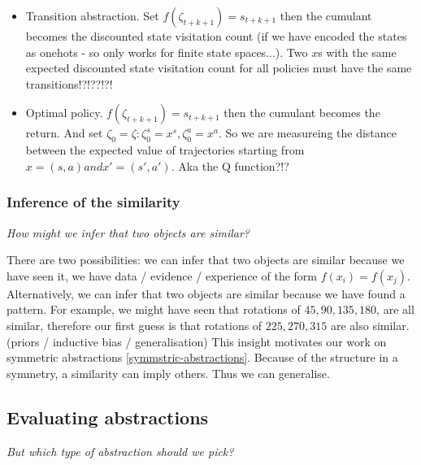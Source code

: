 \begin{itemize}
  \tightlist
  \item Transition abstraction. Set $f(\zeta_{t+k+1}) = s_{t+k+1}$ then the cumulant becomes the discounted state visitation count (if we have encoded the states as onehots - so only works for finite state spaces...). Two $x$s with the same expected discounted state visitation count for all policies must have the same transitions!?!??!?!
  \item Optimal policy. $f(\zeta_{t+k+1}) = s_{t+k+1}$ then the cumulant becomes the return. And set $\zeta_0 = {\zeta: \zeta_0^s = x^s, \zeta_0^a = x^a }$. So we are measureing the distance between the expected value of trajectories starting from $x = (s, a) and x' = (s', a')$. Aka the Q function?!?
\end{itemize}

\subsubsection{Inference of the similarity}

\begin{displayquote}
	\textit{How might we infer that two objects are similar?}
\end{displayquote}



There are two possibilities: we can infer that two objects are similar because we have seen it,
we have data / evidence / experience of the form $f(x_i) = f(x_j)$.
Alternatively, we can infer that two objects are similar because we have found a pattern.
For example, we might have seen that rotations of $45, 90, 135, 180$, are all similar, therefore our first guess
is that rotations of $225, 270, 315$ are also similar. (priors / inductive bias / generalisation)
This insight motivates our work on symmetric abstractions \ref{symmstric-abstractions}.
Because of the structure in a symmetry, a similarity can imply others. Thus we can generalise.



\subsection{Evaluating abstractions}

\begin{displayquote}
\textit{But which type of abstraction should we pick?}
\end{displayquote}


